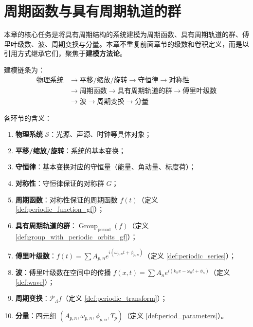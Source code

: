\chapter{周期函数与具有周期轨道的群}

\begin{remark}[本章定位]\label{rem:periodic_function_chapter_positioning}
本章的核心任务是将具有周期结构的系统建模为周期函数、具有周期轨道的群、傅里叶级数、波、周期变换与分量。本章不重复前面章节的级数和卷积定义，而是以引用方式继承它们，聚焦于\textbf{建模方法论}。

建模链条为：
\[
\begin{aligned}
\text{物理系统} &\longrightarrow \text{平移/缩放/旋转} \longrightarrow \text{守恒律} \longrightarrow \text{对称性} \\
&\longrightarrow \text{周期函数} \longrightarrow \text{具有周期轨道的群} \longrightarrow \text{傅里叶级数} \\
&\longrightarrow \text{波} \longrightarrow \text{周期变换} \longrightarrow \text{分量}
\end{aligned}
\]

各环节的含义：
\begin{enumerate}[label=(\roman*)]
    \item \textbf{物理系统} $\mathcal{S}$：光源、声源、时钟等具体对象；
    \item \textbf{平移/缩放/旋转}：系统的基本变换；
    \item \textbf{守恒律}：基本变换对应的守恒量（能量、角动量、标度荷）；
    \item \textbf{对称性}：守恒律保证的对称群 $G$；
    \item \textbf{周期函数}：对称性保证的周期函数 $f(t)$（定义 \ref{def:periodic_function_gf}）；
    \item \textbf{具有周期轨道的群}：$\operatorname{Group}_{\mathrm{period}}(f)$（定义 \ref{def:group_with_periodic_orbits_gf}）；
    \item \textbf{傅里叶级数}：$f(t) = \sum A_{p,n} e^{i(\omega_{p,n} t + \phi_{p,n})}$（定义 \ref{def:periodic_series}）；
    \item \textbf{波}：傅里叶级数在空间中的传播 $f(x,t) = \sum A_n e^{i(k_n x - \omega_n t + \phi_n)}$（定义 \ref{def:wave}）；
    \item \textbf{周期变换}：$\mathcal{P}_\Lambda f$（定义 \ref{def:periodic_transform}）；
    \item \textbf{分量}：四元组 $(A_{p,n}, \omega_{p,n}, \phi_{p,n}, T_p)$（定义 \ref{def:period_parameters}）。
\end{enumerate}


\end{remark}
